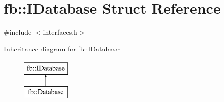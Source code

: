 \hypertarget{structfb_1_1_i_database}{\section{fb\+:\+:I\+Database Struct Reference}
\label{structfb_1_1_i_database}
}


{\ttfamily \#include $<$interfaces.\+h$>$}

Inheritance diagram for fb\+:\+:I\+Database\+:\begin{figure}[H]
\begin{center}
\leavevmode
\includegraphics[height=2.000000cm]{structfb_1_1_i_database}
\end{center}
\end{figure}
